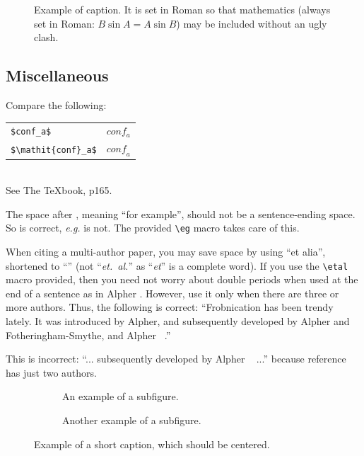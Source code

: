 \documentclass[10pt,twocolumn,letterpaper]{article}
\begin{document}
\begin{figure}[t]
  \centering
  \fbox{\rule{0pt}{2in} \rule{0.9\linewidth}{0pt}}

   \caption{Example of caption.
   It is set in Roman so that mathematics (always set in Roman: $B \sin A = A \sin B$) may be included without an ugly clash.}
   \label{fig:onecol}
\end{figure}

\subsection{Miscellaneous}

\noindent
Compare the following:\\
\begin{tabular}{ll}
 \verb'$conf_a$' &  $conf_a$ \\
 \verb'$\mathit{conf}_a$' & $\mathit{conf}_a$
\end{tabular}\\
See The \TeX book, p165.

The space after \eg, meaning ``for example'', should not be a sentence-ending space.
So \eg is correct, {\em e.g.} is not.
The provided \verb'\eg' macro takes care of this.

When citing a multi-author paper, you may save space by using ``et alia'', shortened to ``\etal'' (not ``{\em et.\ al.}'' as ``{\em et}'' is a complete word).
If you use the \verb'\etal' macro provided, then you need not worry about double periods when used at the end of a sentence as in Alpher \etal.
However, use it only when there are three or more authors.
Thus, the following is correct:
   ``Frobnication has been trendy lately.
   It was introduced by Alpher, and subsequently developed by
   Alpher and Fotheringham-Smythe, and Alpher \etal~\cite{Alpher04}.''

This is incorrect: ``... subsequently developed by Alpher \etal~\cite{Alpher03} ...'' because reference~\cite{Alpher03} has just two authors.




\begin{figure}
  \centering
  \begin{subfigure}{0.68\linewidth}
    \fbox{\rule{0pt}{2in} \rule{.9\linewidth}{0pt}}
    \caption{An example of a subfigure.}
    \label{fig:short-a}
  \end{subfigure}
  \hfill
  \begin{subfigure}{0.28\linewidth}
    \fbox{\rule{0pt}{2in} \rule{.9\linewidth}{0pt}}
    \caption{Another example of a subfigure.}
    \label{fig:short-b}
  \end{subfigure}
  \caption{Example of a short caption, which should be centered.}
  \label{fig:short}
\end{figure}
\end{document}

